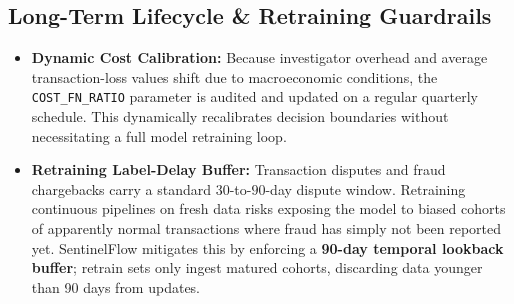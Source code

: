 \documentclass[11pt,a4paper]{article}
\begin{document}
\subsection*{Long-Term Lifecycle \& Retraining Guardrails}
\begin{itemize}
  \item \textbf{Dynamic Cost Calibration:} Because investigator overhead and average transaction-loss values shift due to macroeconomic conditions, the \texttt{COST\_FN\_RATIO} parameter is audited and updated on a regular quarterly schedule. This dynamically recalibrates decision boundaries without necessitating a full model retraining loop.
  \item \textbf{Retraining Label-Delay Buffer:} Transaction disputes and fraud chargebacks carry a standard $30$-to-$90$-day dispute window. Retraining continuous pipelines on fresh data risks exposing the model to biased cohorts of apparently normal transactions where fraud has simply not been reported yet. SentinelFlow mitigates this by enforcing a \textbf{90-day temporal lookback buffer}; retrain sets only ingest matured cohorts, discarding data younger than 90 days from updates.
\end{itemize}


\end{document}
